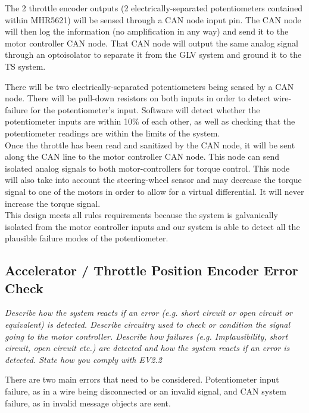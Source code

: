 \documentclass{article}
\begin{document}
    The 2 throttle encoder outputs (2 electrically-separated potentiometers contained within MHR5621) will be sensed through a CAN node input pin. The CAN node will then log the information (no amplification in any way) and send it to the motor controller CAN node. That CAN node will output the same analog signal through an optoisolator to separate it from the GLV system and ground it to the TS system.

    \textnormal{There will be two electrically-separated potentiometers being sensed by a CAN node. There will be pull-down resistors on both inputs in order to detect wire-failure for the potentiometer's input. Software will detect whether the potentiometer inputs are within 10\% of each other, as well as checking that the potentiometer readings are within the limits of the system.}\\

    \textnormal{Once the throttle has been read and sanitized by the CAN node, it will be sent along the CAN line to the motor controller CAN node. This node can send isolated analog signals to both motor-controllers for torque control. This node will also take into account the steering-wheel sensor and may decrease the torque signal to one of the motors in order to allow for a virtual differential. It will never increase the torque signal.}\\

    \textnormal{This design meets all rules requirements because the system is galvanically isolated from the motor controller inputs and our system is able to detect all the plausible failure modes of the potentiometer.}


    \subsection{Accelerator / Throttle Position Encoder Error Check}

    \textit{Describe how the system reacts if an error (e.g. short circuit or open circuit or equivalent) is detected. Describe circuitry used to check or condition the signal going to the motor controller. Describe how failures (e.g. Implausibility, short circuit, open circuit etc.) are detected and how the system reacts if an error is detected. State how you comply with EV2.2}


    \textnormal{
    There are two main errors that need to be considered. Potentiometer input failure, as in a wire being disconnected or an invalid signal, and CAN system failure, as in invalid message objects are sent.
    }\\
\end{document}
